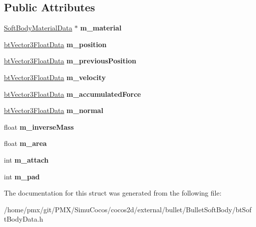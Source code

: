 \subsection*{Public Attributes}
\begin{DoxyCompactItemize}
\item 
\mbox{\label{structSoftBodyNodeData_af6baa1513e97f93a451536fdc795a4d9}} 
\hyperlink{structSoftBodyMaterialData}{Soft\+Body\+Material\+Data} $\ast$ {\bfseries m\+\_\+material}
\item 
\mbox{\label{structSoftBodyNodeData_aa0c132cc1752e4b630865aba51df704c}} 
\hyperlink{structbtVector3FloatData}{bt\+Vector3\+Float\+Data} {\bfseries m\+\_\+position}
\item 
\mbox{\label{structSoftBodyNodeData_a4cbf9490d0df4e6d7735dff8728b785b}} 
\hyperlink{structbtVector3FloatData}{bt\+Vector3\+Float\+Data} {\bfseries m\+\_\+previous\+Position}
\item 
\mbox{\label{structSoftBodyNodeData_a8fb72104d280eaa306813f53df341c72}} 
\hyperlink{structbtVector3FloatData}{bt\+Vector3\+Float\+Data} {\bfseries m\+\_\+velocity}
\item 
\mbox{\label{structSoftBodyNodeData_a02f1a2aabf0390dfc804273ea11b8b5c}} 
\hyperlink{structbtVector3FloatData}{bt\+Vector3\+Float\+Data} {\bfseries m\+\_\+accumulated\+Force}
\item 
\mbox{\label{structSoftBodyNodeData_a203d1d911752253ca23603a4b973caab}} 
\hyperlink{structbtVector3FloatData}{bt\+Vector3\+Float\+Data} {\bfseries m\+\_\+normal}
\item 
\mbox{\label{structSoftBodyNodeData_a4d3926ca40971d11a4cb9f6839622682}} 
float {\bfseries m\+\_\+inverse\+Mass}
\item 
\mbox{\label{structSoftBodyNodeData_a009ecbfaab4325952b028b88a70c6271}} 
float {\bfseries m\+\_\+area}
\item 
\mbox{\label{structSoftBodyNodeData_acf4ecf747225f90a77f19a9fbf10693a}} 
int {\bfseries m\+\_\+attach}
\item 
\mbox{\label{structSoftBodyNodeData_af2f26538337d7f07465ce37c6c73cc86}} 
int {\bfseries m\+\_\+pad}
\end{DoxyCompactItemize}


The documentation for this struct was generated from the following file\+:\begin{DoxyCompactItemize}
\item 
/home/pmx/git/\+P\+M\+X/\+Simu\+Cocos/cocos2d/external/bullet/\+Bullet\+Soft\+Body/bt\+Soft\+Body\+Data.\+h\end{DoxyCompactItemize}
